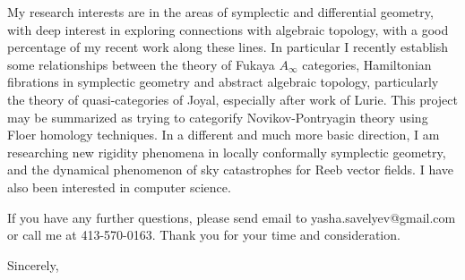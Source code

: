 \documentclass[12pt]{letter}
\begin{document}
\begin{letter}{
}
%

My research interests are in the areas of symplectic and differential geometry, 
with deep interest in exploring connections with algebraic topology,  with a
good percentage of my recent work along these lines.  In particular I recently
establish some  relationships between the theory of Fukaya $A _{\infty} $
categories, Hamiltonian fibrations in symplectic geometry and abstract
algebraic topology, particularly the theory of quasi-categories of Joyal,
especially after work of Lurie. This project may be summarized as trying to categorify Novikov-Pontryagin theory using Floer homology techniques.
In a different and much more basic direction, I am researching new rigidity phenomena in locally conformally symplectic geometry, 
and the dynamical phenomenon of sky catastrophes for Reeb vector fields. I have also been interested in computer science.

 If
you have any further questions, please send email to 
{\sf yasha.savelyev@gmail.com} or call me at 413-570-0163. 
Thank you for your time and consideration.


\closing{Sincerely,} 


\end{letter}
\end{document}
